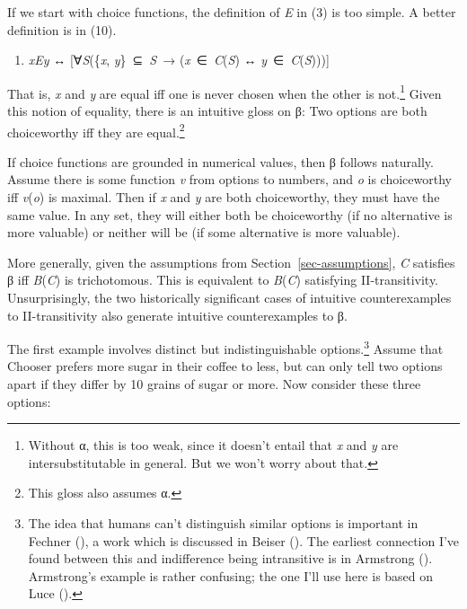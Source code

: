 \documentclass[
  11pt,
  letterpaper,
  DIV=11,
  numbers=noendperiod,
  twoside]{scrartcl}
\providecommand{\tightlist}{%
  \setlength{\itemsep}{0pt}\setlength{\parskip}{0pt}}
\begin{document}
If we start with choice functions, the definition of \emph{E} in (3) is
too simple. A better definition is in (10).

\begin{enumerate}
\def\labelenumi{(\arabic{enumi})}
\setcounter{enumi}{9}
\tightlist
\item
  \emph{xEy} ↔ {[}∀\emph{S}(\{\emph{x}, \emph{y}\}~⊆~\emph{S}~→
  (\emph{x}~∈~\emph{C}(\emph{S}) ↔ \emph{y}~∈~\emph{C}(\emph{S}))){]}
\end{enumerate}

That is, \emph{x} and \emph{y} are equal iff one is never chosen when
the other is not.\footnote{Without α, this is too weak, since it doesn't
  entail that \emph{x} and \emph{y} are intersubstitutable in general.
  But we won't worry about that.} Given this notion of equality, there
is an intuitive gloss on β: Two options are both choiceworthy iff they
are equal.\footnote{This gloss also assumes α.}

If choice functions are grounded in numerical values, then β follows
naturally. Assume there is some function \emph{v} from options to
numbers, and \emph{o} is choiceworthy iff \emph{v}(\emph{o}) is maximal.
Then if \emph{x} and \emph{y} are both choiceworthy, they must have the
same value. In any set, they will either both be choiceworthy (if no
alternative is more valuable) or neither will be (if some alternative is
more valuable).

More generally, given the assumptions from
Section~\ref{sec-assumptions}, \emph{C} satisfies β iff
\emph{B}(\emph{C}) is trichotomous. This is equivalent to
\emph{B}(\emph{C}) satisfying II-transitivity. Unsurprisingly, the two
historically significant cases of intuitive counterexamples to
II-transitivity also generate intuitive counterexamples to β.

The first example involves distinct but indistinguishable
options.\footnote{The idea that humans can't distinguish similar options
  is important in Fechner (), a work
  which is discussed in Beiser (). The
  earliest connection I've found between this and indifference being
  intransitive is in Armstrong ().
  Armstrong's example is rather confusing; the one I'll use here is
  based on Luce ().} Assume that Chooser
prefers more sugar in their coffee to less, but can only tell two
options apart if they differ by 10 grains of sugar or more. Now consider
these three options:
\end{document}
